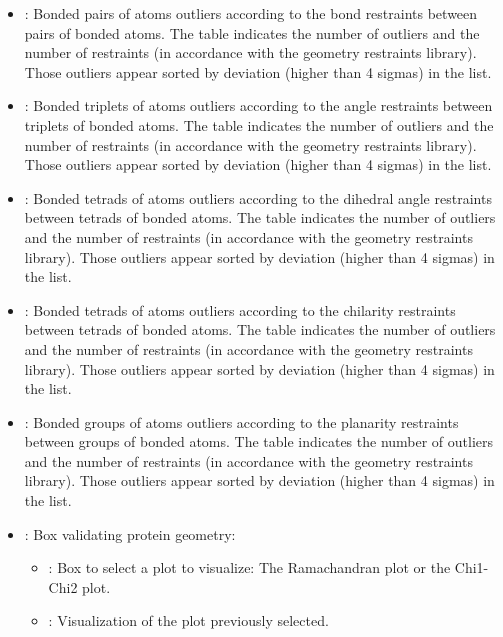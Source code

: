 \begin{itemize}
\begin{itemize}
\begin{itemize}
         \item {}: Bonded pairs of atoms outliers according to the bond restraints between pairs of bonded atoms. The  table indicates the number of outliers and the number of restraints (in accordance with the geometry restraints library). Those outliers appear sorted by deviation (higher than 4 sigmas) in the  list.
         \item {}: Bonded triplets of atoms outliers according to the angle restraints between triplets of bonded atoms. The  table indicates the number of outliers and the number of restraints (in accordance with the geometry restraints library). Those outliers appear sorted by deviation (higher than 4 sigmas) in the  list.
         \item {}: Bonded tetrads of atoms outliers according to the dihedral angle restraints between tetrads of bonded atoms. The  table indicates the number of outliers and the number of restraints (in accordance with the geometry restraints library). Those outliers appear sorted by deviation (higher than 4 sigmas) in the  list.
         \item {}: Bonded tetrads of atoms outliers according to the chilarity restraints between tetrads of bonded atoms. The  table indicates the number of outliers and the number of restraints (in accordance with the geometry restraints library). Those outliers appear sorted by deviation (higher than 4 sigmas) in the  list.
         \item {}: Bonded groups of atoms outliers according to the planarity restraints between groups of bonded atoms. The  table indicates the number of outliers and the number of restraints (in accordance with the geometry restraints library). Those outliers appear sorted by deviation (higher than 4 sigmas) in the  list.
         \item {}: Box validating protein geometry:
         \begin{itemize}
          \item {}: Box to select a plot to visualize: The Ramachandran plot or the Chi1-Chi2 plot.
          \item {}: Visualization of the plot previously selected.

\end{itemize}
\end{itemize}
\end{itemize}
\end{itemize}
